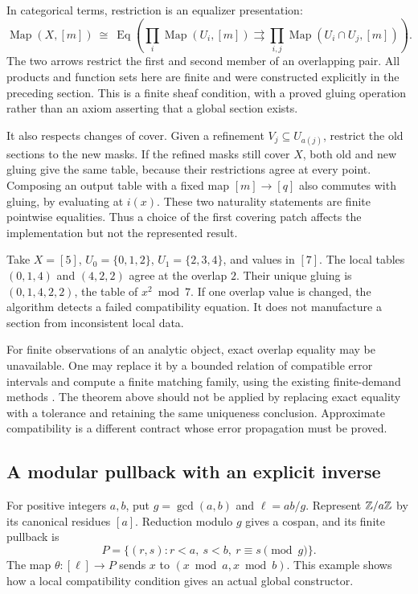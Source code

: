 In categorical terms, restriction is an equalizer presentation:
\[
 \operatorname{Map}(X,[m])\ \cong\
 \operatorname{Eq}\!\left(
  \prod_i\operatorname{Map}(U_i,[m])
  \rightrightarrows
  \prod_{i,j}\operatorname{Map}(U_i\cap U_j,[m])\right).
\]
The two arrows restrict the first and second member of an overlapping pair.
All products and function sets here are finite and were constructed explicitly
in the preceding section. This is a finite sheaf condition, with a proved
gluing operation rather than an axiom asserting that a global section exists.

It also respects changes of cover. Given a refinement $V_j\subseteq
U_{a(j)}$, restrict the old sections to the new masks. If the refined masks
still cover $X$, both old and new gluing give the same table, because their
restrictions agree at every point. Composing an output table with a fixed
map $[m]\to[q]$ also commutes with gluing, by evaluating at $i(x)$.
These two naturality statements are finite pointwise equalities. Thus a
choice of the first covering patch affects the implementation but not the
represented result.

\begin{example}
Take $X=[5]$, $U_0=\{0,1,2\}$, $U_1=\{2,3,4\}$, and values in $[7]$.
The local tables $(0,1,4)$ and $(4,2,2)$ agree at the overlap $2$.
Their unique gluing is $(0,1,4,2,2)$, the table of $x^2\bmod7$.
If one overlap value is changed, the algorithm detects a failed compatibility
equation. It does not manufacture a section from inconsistent local data.
\end{example}

For finite observations of an analytic object, exact overlap equality may be
unavailable. One may replace it by a bounded relation of compatible error
intervals and compute a finite matching family, using the existing
finite-demand methods \cite{repo-evidence,repo-demand}. The theorem above
should not be applied by replacing exact equality with a tolerance and
retaining the same uniqueness conclusion. Approximate compatibility is a
different contract whose error propagation must be proved.

\subsection{A modular pullback with an explicit inverse}

For positive integers $a,b$, put $g=\gcd(a,b)$ and $\ell=ab/g$.
Represent $\mathbb Z/a\mathbb Z$ by its canonical residues $[a]$. Reduction modulo $g$
gives a cospan, and its finite pullback is
\[
 P=\{(r,s):r<a,\ s<b,\ r\equiv s\pmod g\}.
\]
The map $\theta:[\ell]\to P$ sends $x$ to $(x\bmod a,x\bmod b)$.
This example shows how a local compatibility condition gives an actual
global constructor.

